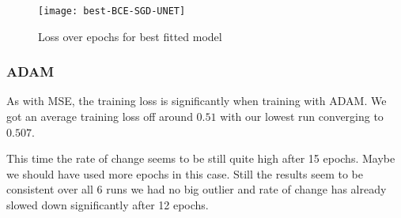 \begin{figure}[h]
    \texttt{[image: best-BCE-SGD-UNET]}
    \caption{\label{im:best-BCE-SGD-UNET} Loss over epochs for best fitted model}
\end{figure}

\newpage

\subsubsection{ADAM}

As with MSE, the training loss is significantly when training with ADAM. We got an average training loss
off around $0.51$ with our lowest run converging to $0.507$.

This time the rate of change seems to be still quite high after 15 epochs. Maybe we should have used more
epochs in this case. Still the results seem to be consistent over all 6 runs we had no big outlier and rate of
change has already slowed down significantly after 12 epochs.


